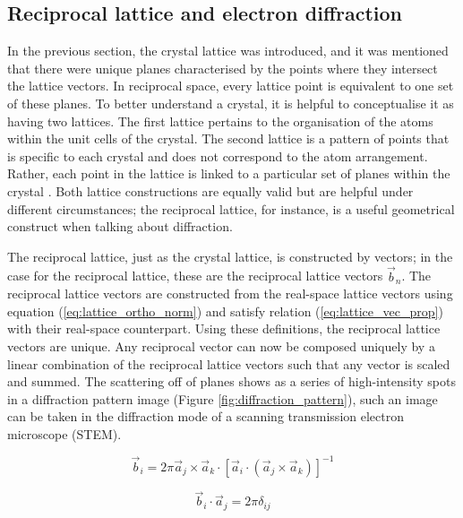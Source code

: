 \subsection{Reciprocal lattice and electron diffraction}
\label{sec:diffraction}
In the previous section, the crystal lattice was introduced, and it was mentioned that there were unique planes characterised by the points where they intersect the lattice vectors.
In reciprocal space, every lattice point is equivalent to one set of these planes.
To better understand a crystal, it is helpful to conceptualise it as having two lattices. The first lattice pertains to the organisation of the atoms within the unit cells of the crystal. The second lattice is a pattern of points that is specific to each crystal and does not correspond to the atom arrangement. Rather, each point in the lattice is linked to a particular set of planes within the crystal \cite{Williams2009-ww}.
Both lattice constructions are equally valid but are helpful under different circumstances; the reciprocal lattice, for instance, is a useful geometrical construct when talking about diffraction.

The reciprocal lattice, just as the crystal lattice, is constructed by vectors; in the case for the reciprocal lattice, these are the reciprocal lattice vectors $\vec{b}_n$.
The reciprocal lattice vectors are constructed from the real-space lattice vectors using equation (\ref{eq:lattice_ortho_norm}) and satisfy relation (\ref{eq:lattice_vec_prop}) with their real-space counterpart.
Using these definitions, the reciprocal lattice vectors are unique.
Any reciprocal vector can now be composed uniquely by a linear combination of the reciprocal lattice vectors such that any vector is scaled and summed.
The scattering off of planes shows as a series of high-intensity spots in a diffraction pattern image (Figure \ref{fig:diffraction_pattern}), such an image can be taken in the diffraction mode of a scanning transmission electron microscope (STEM). \\

\begin{minipage}{0.5\textwidth}
    \begin{equation}
        \vec{b}_i = 2 \pi \vec{a}_j \times \vec{a}_k \cdot \left[ \vec{a}_i \cdot ( \vec{a}_j \times \vec{a}_k ) \right]^{-1} 
        \label{eq:lattice_ortho_norm}
    \end{equation}
\end{minipage}%
\begin{minipage}{0.5\textwidth}
    \begin{equation}
        \vec{b}_i \cdot \vec{a}_j = 2\pi \delta_{ij}
        \label{eq:lattice_vec_prop}
    \end{equation}
\end{minipage}\\


